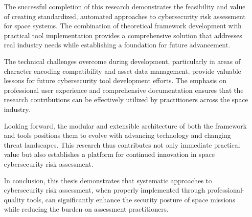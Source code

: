 \documentclass[binding=0.6cm]{sapthesis}
\begin{document}
The successful completion of this research demonstrates the feasibility and value of creating standardized, automated approaches to cybersecurity risk assessment for space systems. The combination of theoretical framework development with practical tool implementation provides a comprehensive solution that addresses real industry needs while establishing a foundation for future advancement.

The technical challenges overcome during development, particularly in areas of character encoding compatibility and asset data management, provide valuable lessons for future cybersecurity tool development efforts. The emphasis on professional user experience and comprehensive documentation ensures that the research contributions can be effectively utilized by practitioners across the space industry.

Looking forward, the modular and extensible architecture of both the framework and tools positions them to evolve with advancing technology and changing threat landscapes. This research thus contributes not only immediate practical value but also establishes a platform for continued innovation in space cybersecurity risk assessment.

In conclusion, this thesis demonstrates that systematic approaches to cybersecurity risk assessment, when properly implemented through professional-quality tools, can significantly enhance the security posture of space missions while reducing the burden on assessment practitioners.

\backmatter
\end{document}
